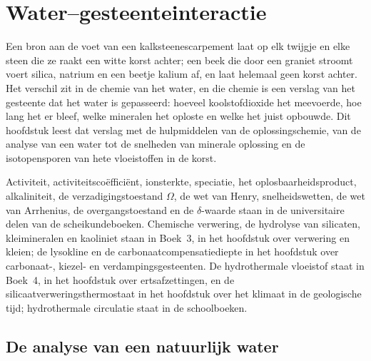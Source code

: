 \chapter{Water--gesteenteinteractie}\label{ch:b3:water-rock-interaction}

Een bron aan de voet van een kalksteenescarpement laat op elk twijgje en elke steen die ze raakt een witte korst achter;
een beek die door een graniet stroomt voert silica, natrium
en een beetje kalium af, en laat helemaal geen korst achter. Het verschil zit in de chemie van het water,
en die chemie is een verslag van het gesteente dat het water is gepasseerd: hoeveel koolstofdioxide het meevoerde, hoe lang het er bleef,
welke mineralen het oploste en welke het juist opbouwde. Dit hoofdstuk leest dat verslag met
de hulpmiddelen van de oplossingschemie, van de analyse van een water tot de snelheden van
minerale oplossing en de isotopensporen van hete vloeistoffen
in de korst.

\begin{recall}
Activiteit, activiteitscoëfficiënt, ionsterkte, speciatie, het oplosbaarheidsproduct,
alkaliniteit, de verzadigingstoestand $\Omega$, de wet van Henry, snelheidswetten,
de wet van Arrhenius, de overgangstoestand en de $\delta$-waarde staan in de
universitaire delen van de scheikundeboeken. Chemische verwering, de hydrolyse van
silicaten, kleimineralen en kaoliniet staan in Boek~3, in het hoofdstuk over verwering
en kleien; de lysokline en de carbonaatcompensatiediepte in het hoofdstuk over
carbonaat-, kiezel- en verdampingsgesteenten. De hydrothermale vloeistof staat in Boek~4,
in het hoofdstuk over ertsafzettingen, en de silicaatverweringsthermostaat in het
hoofdstuk over het klimaat in de geologische tijd;
hydrothermale circulatie staat in de schoolboeken.
\end{recall}

\section{De analyse van een natuurlijk water}\label{sec:b3:water-rock-interaction:analysis}

